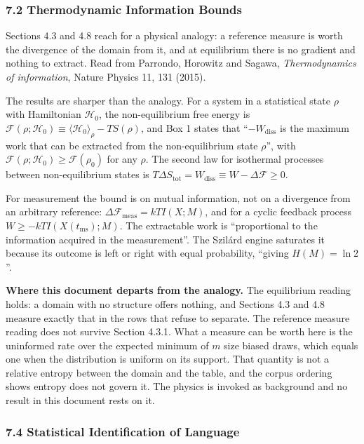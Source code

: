 \subsubsection{7.2 Thermodynamic Information Bounds}

Sections 4.3 and 4.8 reach for a physical analogy: a reference measure is worth the divergence of the domain from it, and at equilibrium there is no gradient and nothing to extract. Read from Parrondo, Horowitz and Sagawa, \emph{Thermodynamics of information}, Nature Physics 11, 131 (2015).

The results are sharper than the analogy. For a system in a statistical state \(\rho\) with Hamiltonian \(\mathcal{H}_0\), the non-equilibrium free energy is \(\mathcal{F}(\rho;\mathcal{H}_0) \equiv \langle \mathcal{H}_0\rangle_\rho - TS(\rho)\), and Box 1 states that ``\(-W_{\text{diss}}\) is the maximum work that can be extracted from the non-equilibrium state \(\rho\)'', with \(\mathcal{F}(\rho;\mathcal{H}_0) \ge \mathcal{F}(\rho_0)\) for any \(\rho\). The second law for isothermal processes between non-equilibrium states is \(T\Delta S_{\text{tot}} = W_{\text{diss}} \equiv W - \Delta\mathcal{F} \ge 0\).

For measurement the bound is on mutual information, not on a divergence from an arbitrary reference: \(\Delta \mathcal{F}_{\text{meas}} = kTI(X;M)\), and for a cyclic feedback process \(W \ge -kTI(X(t_{\text{ms}});M)\). The extractable work is ``proportional to the information acquired in the measurement''. The Szilárd engine saturates it because its outcome is left or right with equal probability, ``giving \(H(M) = \ln 2\)''.

\noindent\textbf{Where this document departs from the analogy.} The equilibrium reading holds: a domain with no structure offers nothing, and Sections 4.3 and 4.8 measure exactly that in the rows that refuse to separate. The reference measure reading does not survive Section 4.3.1. What a measure can be worth here is the uninformed rate over the expected minimum of \(m\) size biased draws, which equals one when the distribution is uniform on its support. That quantity is not a relative entropy between the domain and the table, and the corpus ordering shows entropy does not govern it. The physics is invoked as background and no result in this document rests on it.

\subsubsection{7.4 Statistical Identification of Language}

